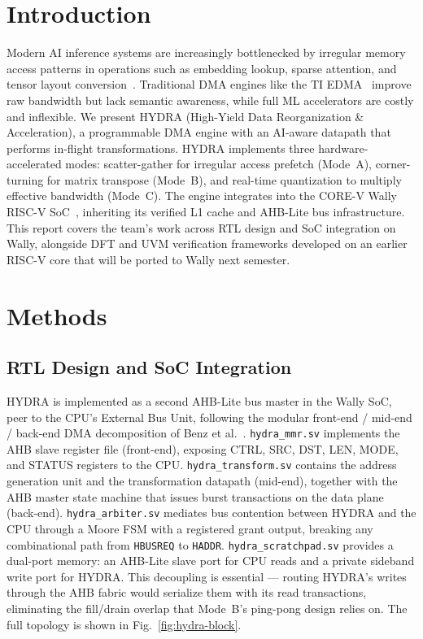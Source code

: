 \documentclass[conference]{IEEEtran}
\begin{document}
\section{Introduction}
    Modern AI inference systems are increasingly bottlenecked by irregular 
    memory access patterns in operations such as embedding lookup, sparse 
    attention, and tensor layout conversion~\cite{tripp2024}. Traditional 
    DMA engines like the TI EDMA~\cite{ti_edma} improve raw bandwidth but 
    lack semantic awareness, while full ML accelerators are costly and 
    inflexible. We present HYDRA (High-Yield Data Reorganization \& 
    Acceleration), a programmable DMA engine with an AI-aware datapath 
    that performs in-flight transformations. HYDRA implements three 
    hardware-accelerated modes: scatter-gather for irregular access prefetch 
    (Mode~A), corner-turning for matrix transpose (Mode~B), and real-time 
    quantization to multiply effective bandwidth (Mode~C). The engine 
    integrates into the CORE-V Wally RISC-V SoC~\cite{harris2022wally}, 
    inheriting its verified L1 cache and AHB-Lite bus infrastructure. 
    This report covers the team's work across RTL design and SoC integration 
    on Wally, alongside DFT and UVM verification frameworks developed on 
    an earlier RISC-V core that will be ported to Wally next semester.
\section{Methods}
    \subsection{RTL Design and SoC Integration}
        HYDRA is implemented as a second AHB-Lite bus master in the Wally SoC, 
        peer to the CPU's External Bus Unit, following the modular front-end / 
        mid-end / back-end DMA decomposition of Benz et al.~\cite{benz2023}. 
        \texttt{hydra\_mmr.sv} implements the AHB slave register file (front-end), 
        exposing CTRL, SRC, DST, LEN, MODE, and STATUS registers to the CPU. 
        \texttt{hydra\_transform.sv} contains the address generation unit and 
        the transformation datapath (mid-end), together with the AHB master 
        state machine that issues burst transactions on the data plane (back-end). 
        \texttt{hydra\_arbiter.sv} mediates bus contention between HYDRA and 
        the CPU through a Moore FSM with a registered grant output, breaking 
        any combinational path from \texttt{HBUSREQ} to \texttt{HADDR}. 
        \texttt{hydra\_scratchpad.sv} provides a dual-port memory: an AHB-Lite 
        slave port for CPU reads and a private sideband write port for HYDRA. 
        This decoupling is essential --- routing HYDRA's writes through the AHB 
        fabric would serialize them with its read transactions, eliminating 
        the fill/drain overlap that Mode~B's ping-pong design relies on. The 
        full topology is shown in Fig.~\ref{fig:hydra-block}.
        
\end{document}
